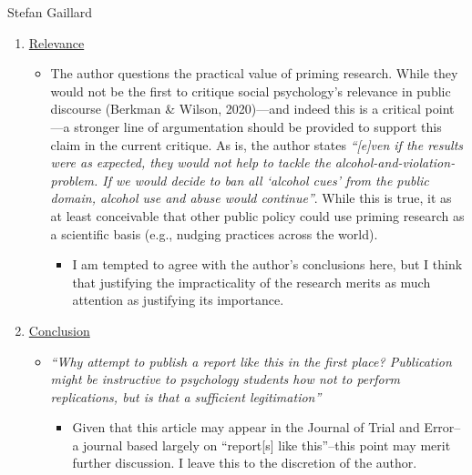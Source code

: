 \documentclass[twocolumn, serif, review, authordate]{jote-article}
\begin{document}
\begin{paracol}{2}
\begin{reviewend}{Stefan Gaillard}
\begin{enumerate}[label=\textbf{\arabic*}), start=0]
    \item \hyperref[sec:relevance]{Relevance}
        \begin{itemize}
            \item The author questions the practical value of priming research. While they would not be the first to critique social psychology’s relevance in public discourse (Berkman \& Wilson, 2020)—and indeed this is a critical point—a stronger line of argumentation should be provided to support this claim in the current critique. As is, the author states \textit{``[e]ven if the results were as expected, they would not help to tackle the alcohol-and-violation-problem. If we would decide to ban all `alcohol cues' from the public domain, alcohol use and abuse would continue''}. While this is true, it as at least conceivable that other public policy could use priming research as a scientific basis (e.g., nudging practices across the world). 
            \begin{itemize}
                \item I am tempted to agree with the author's conclusions here, but I think that justifying the impracticality of the research merits as much attention as justifying its importance.
            \end{itemize}
        \end{itemize}
        
    \item \hyperref[sec:conclusion]{Conclusion}
        \begin{itemize}
            \item \textit{``Why attempt to publish a report like this in the first place? Publication might be instructive to psychology students how not to perform replications, but is that a sufficient legitimation''}
            \begin{itemize}
                \item Given that this article may appear in the Journal of Trial and Error--a journal based largely on ``report[s] like this''--this point may merit further discussion. I leave this to the discretion of the author. 
            \end{itemize}
        \end{itemize}
        
    \end{enumerate}
\end{reviewend}
\end{paracol}

\printbibliography
\end{document}
